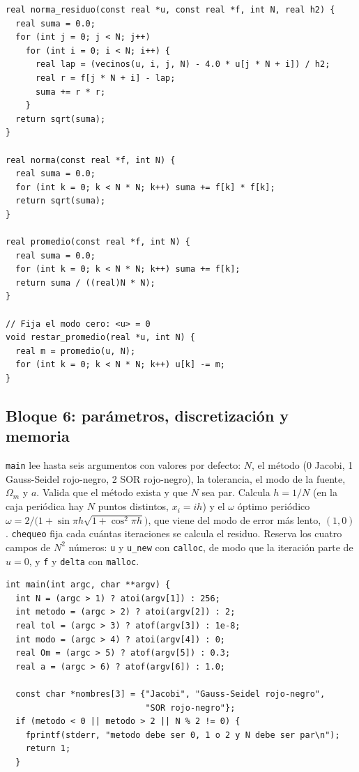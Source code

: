 \begin{appendix}
\begin{lstlisting}
real norma_residuo(const real *u, const real *f, int N, real h2) {
  real suma = 0.0;
  for (int j = 0; j < N; j++)
    for (int i = 0; i < N; i++) {
      real lap = (vecinos(u, i, j, N) - 4.0 * u[j * N + i]) / h2;
      real r = f[j * N + i] - lap;
      suma += r * r;
    }
  return sqrt(suma);
}

real norma(const real *f, int N) {
  real suma = 0.0;
  for (int k = 0; k < N * N; k++) suma += f[k] * f[k];
  return sqrt(suma);
}

real promedio(const real *f, int N) {
  real suma = 0.0;
  for (int k = 0; k < N * N; k++) suma += f[k];
  return suma / ((real)N * N);
}

// Fija el modo cero: <u> = 0
void restar_promedio(real *u, int N) {
  real m = promedio(u, N);
  for (int k = 0; k < N * N; k++) u[k] -= m;
}
\end{lstlisting}

\subsection{Bloque 6: parámetros, discretización y memoria}

\texttt{main} lee hasta seis argumentos con valores por defecto: $N$, el método (0 Jacobi, 1 Gauss-Seidel rojo-negro, 2 SOR rojo-negro), la tolerancia, el modo de la fuente, $\Omega_m$ y $a$. Valida que el método exista y que $N$ sea par. Calcula $h=1/N$ (en la caja periódica hay $N$ puntos distintos, $x_i=ih$) y el $\omega$ óptimo periódico $\omega=2/\big(1+\sin\pi h\sqrt{1+\cos^2\pi h}\big)$, que viene del modo de error más lento, $(1,0)$. \texttt{chequeo} fija cada cuántas iteraciones se calcula el residuo. Reserva los cuatro campos de $N^2$ números: \texttt{u} y \texttt{u\_new} con \texttt{calloc}, de modo que la iteración parte de $u=0$, y \texttt{f} y \texttt{delta} con \texttt{malloc}.

\begin{lstlisting}
int main(int argc, char **argv) {
  int N = (argc > 1) ? atoi(argv[1]) : 256;
  int metodo = (argc > 2) ? atoi(argv[2]) : 2;
  real tol = (argc > 3) ? atof(argv[3]) : 1e-8;
  int modo = (argc > 4) ? atoi(argv[4]) : 0;
  real Om = (argc > 5) ? atof(argv[5]) : 0.3;
  real a = (argc > 6) ? atof(argv[6]) : 1.0;

  const char *nombres[3] = {"Jacobi", "Gauss-Seidel rojo-negro",
                            "SOR rojo-negro"};
  if (metodo < 0 || metodo > 2 || N % 2 != 0) {
    fprintf(stderr, "metodo debe ser 0, 1 o 2 y N debe ser par\n");
    return 1;
  }


\end{lstlisting}
\end{appendix}
